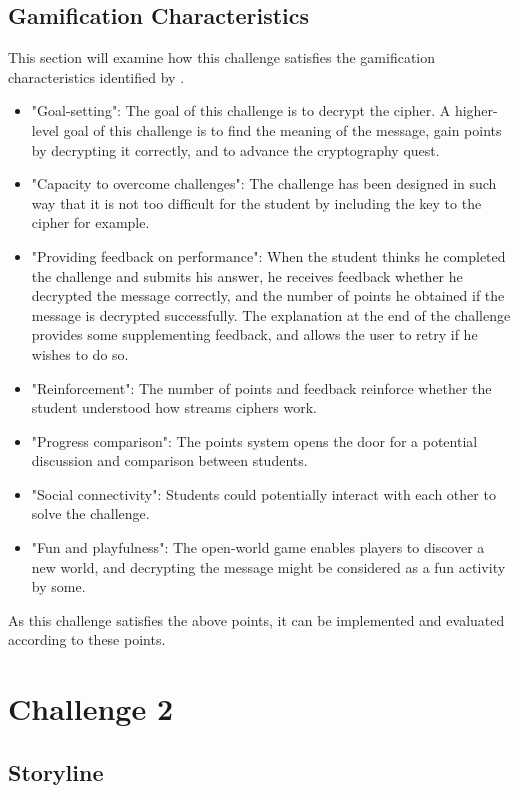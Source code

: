 \documentclass{l4proj}
\begin{document}
\subsection{Gamification Characteristics}

This section will examine how this challenge satisfies the gamification characteristics identified
by \citet{cugelman_gamification:_2013}.
\begin{itemize}
    \item "Goal-setting": The goal of this challenge is to decrypt the cipher. 
    A higher-level goal of this challenge is to find the meaning of the message, gain points by decrypting it correctly, 
    and to advance the cryptography quest.
    \item "Capacity to overcome challenges": The challenge has been designed in such way 
    that it is not too difficult for the student by including the key to the cipher for example.
    \item "Providing feedback on performance": When the student thinks he completed the challenge and submits his answer,
    he receives feedback whether he decrypted the message correctly, 
    and the number of points he obtained if the message is decrypted successfully. 
    The explanation at the end of the challenge provides some supplementing feedback, 
    and allows the user to retry if he wishes to do so.
    \item "Reinforcement": The number of points and feedback reinforce whether the student understood how streams ciphers work.
    \item "Progress comparison": The points system opens the door for a potential discussion and comparison between students.
    \item "Social connectivity": Students could potentially interact with each other to solve the challenge.
    \item "Fun and playfulness": The open-world game enables players to discover a new world, 
    and decrypting the message might be considered as a fun activity by some.
\end{itemize}
As this challenge satisfies the above points, 
it can be implemented and evaluated according to these points.

\section{Challenge 2}

\subsection{Storyline}
\end{document}
